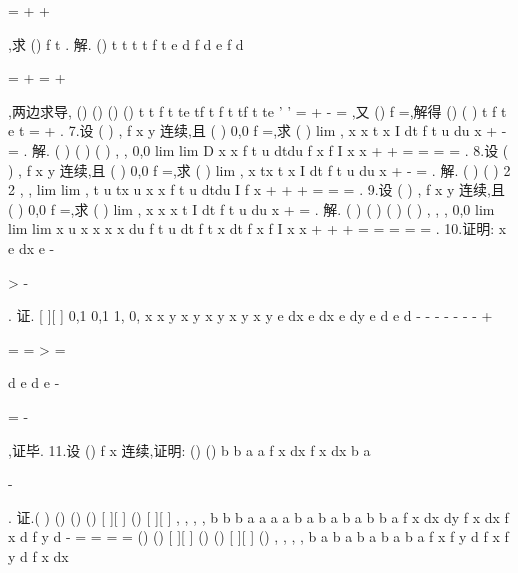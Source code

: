 =
+
+




\int \int 
,求
()
f t . 
解.
()
t
t
t
t
f t
e
d
f
d
e
f
d
\pi 
\pi 
\pi 
\theta 
\rho \rho \rho 
\pi 
\rho \rho \rho 




=
+
=
+








\int 
\int 
\int 
,两边求导, 
()
()
()
()
t
t
f
t
te
tf t
f
t
tf t
te
\pi 
\pi 
\pi 
\pi 
\pi 
\pi 
'
'
=
+
\Rightarrow 
-
=
,又
()
f
=,解得 
()
(
)
t
f t
e
t
\pi 
\pi 
=
+
. 
7.设
(
)
,
f x y 连续,且
(
)
0,0
f
=,求
(
)
lim
,
x
x t
x
I
dt
f t u du
x
+
-
\to 
=
\int 
\int 
. 
解.
(
)
(
)
(
)
,
,
0,0
lim
lim
D
x
x
f t u dtdu
f
x
f
I
x
x
\psi \eta 
+
+
\to 
\to 
\cdots 
=
=
=
=
\int \int 
. 
8.设
(
)
,
f x y 连续,且
(
)
0,0
f
=,求
(
)
lim
,
x
tx t
x
I
dt
f t u du
x
+
-
\to 
=
\int 
\int 
. 
解.
(
)
(
)
2 2
,
,
lim
lim
,
t
u
tx u
x
x
f t u dtdu
I
f
x
\pi 
\pi 
\psi \eta 
+
+
+
\le 
\ge 
\to 
\to 
=
=
=
\int \int 
. 
9.设
(
)
,
f x y 连续,且
(
)
0,0
f
=,求
(
)
lim
,
x
x
x
t
I
dt
f t u du
x
+
\to 
=
\int \int 
. 
解.
(
)
(
)
(
)
(
)
,
,
,
0,0
lim
lim
lim
x
u
x
x
x
x
du
f t u dt
f t x dt
f
x
f
I
x
x
\psi 
+
+
+
\to 
\to 
\to 
=
=
=
=
=
\int 
\int 
\int 
. 
10.证明:
x
e
dx
e
\pi 
-




>
-








\int 
. 
证.
[
][
]
0,1
0,1
1,
0,
x
x
y
x
y
x
y
x
y
x
y
e
dx
e
dx e
dy
e
d
e
d
\sigma 
\sigma 
-
-
-
-
-
-
-
\times 
+
\le 
\ge 
\ge 

=
=
>
=




\int 
\int 
\int 
\int \int 
\int \int 
d
e
d
e
\pi 
\rho 
\pi 
\theta 
\rho \rho 
-


=
-




\int 
\int 
,证毕. 
11.设
()
f x 连续,证明:
()
()
b
b
a
a
f
x dx
f x dx
b
a


\ge 


-


\int 
\int 
. 
证.(
)
()
()
()
[
][
]
()
[
][
]
,
,
,
,
b
b
b
a
a
a
a b
a b
a b
a b
b
a
f
x dx
dy
f
x dx
f
x d
f
y d
\sigma 
\sigma 
\times 
\times 
-
=
=
=
=
\int 
\int \int 
\int \int 
\int \int 
()
()
[
][
]
()
()
[
][
]
()
,
,
,
,
b
a b
a b
a b
a b
a
f
x
f
y
d
f x f
y d
f x dx
\sigma 
\sigma 
\times 
\times 




